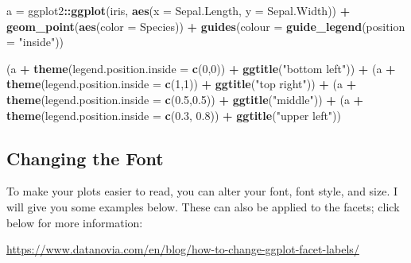 \documentclass[
]{book}
\newenvironment{Shaded}{\begin{snugshade}}{\end{snugshade}}
\newcommand{\AttributeTok}[1]{\textcolor[rgb]{0.13,0.29,0.53}{#1}}
\newcommand{\DecValTok}[1]{\textcolor[rgb]{0.00,0.00,0.81}{#1}}
\newcommand{\FloatTok}[1]{\textcolor[rgb]{0.00,0.00,0.81}{#1}}
\newcommand{\FunctionTok}[1]{\textcolor[rgb]{0.13,0.29,0.53}{\textbf{#1}}}
\newcommand{\NormalTok}[1]{#1}
\newcommand{\OtherTok}[1]{\textcolor[rgb]{0.56,0.35,0.01}{#1}}
\newcommand{\SpecialCharTok}[1]{\textcolor[rgb]{0.81,0.36,0.00}{\textbf{#1}}}
\newcommand{\StringTok}[1]{\textcolor[rgb]{0.31,0.60,0.02}{#1}}
\begin{document}
\begin{Shaded}
\begin{Highlighting}[]
\NormalTok{a }\OtherTok{=}\NormalTok{ ggplot2}\SpecialCharTok{::}\FunctionTok{ggplot}\NormalTok{(iris, }\FunctionTok{aes}\NormalTok{(}\AttributeTok{x =}\NormalTok{ Sepal.Length, }\AttributeTok{y =}\NormalTok{ Sepal.Width)) }\SpecialCharTok{+}
  \FunctionTok{geom\_point}\NormalTok{(}\FunctionTok{aes}\NormalTok{(}\AttributeTok{color =}\NormalTok{ Species)) }\SpecialCharTok{+}
  \FunctionTok{guides}\NormalTok{(}\AttributeTok{colour =} \FunctionTok{guide\_legend}\NormalTok{(}\AttributeTok{position =} \StringTok{"inside"}\NormalTok{))}

\NormalTok{(a }\SpecialCharTok{+} \FunctionTok{theme}\NormalTok{(}\AttributeTok{legend.position.inside =} \FunctionTok{c}\NormalTok{(}\DecValTok{0}\NormalTok{,}\DecValTok{0}\NormalTok{)) }\SpecialCharTok{+} \FunctionTok{ggtitle}\NormalTok{(}\StringTok{"bottom left"}\NormalTok{)) }\SpecialCharTok{+}
\NormalTok{  (a }\SpecialCharTok{+} \FunctionTok{theme}\NormalTok{(}\AttributeTok{legend.position.inside =} \FunctionTok{c}\NormalTok{(}\DecValTok{1}\NormalTok{,}\DecValTok{1}\NormalTok{)) }\SpecialCharTok{+} \FunctionTok{ggtitle}\NormalTok{(}\StringTok{"top right"}\NormalTok{)) }\SpecialCharTok{+}
\NormalTok{  (a }\SpecialCharTok{+} \FunctionTok{theme}\NormalTok{(}\AttributeTok{legend.position.inside =} \FunctionTok{c}\NormalTok{(}\FloatTok{0.5}\NormalTok{,}\FloatTok{0.5}\NormalTok{)) }\SpecialCharTok{+} \FunctionTok{ggtitle}\NormalTok{(}\StringTok{"middle"}\NormalTok{)) }\SpecialCharTok{+}
\NormalTok{  (a }\SpecialCharTok{+} \FunctionTok{theme}\NormalTok{(}\AttributeTok{legend.position.inside =} \FunctionTok{c}\NormalTok{(}\FloatTok{0.3}\NormalTok{, }\FloatTok{0.8}\NormalTok{)) }\SpecialCharTok{+} \FunctionTok{ggtitle}\NormalTok{(}\StringTok{"upper left"}\NormalTok{)) }
\end{Highlighting}
\end{Shaded}

\subsection{Changing the Font}\label{changing-the-font}

To make your plots easier to read, you can alter your font, font style, and size. I will give you some examples below. These can also be applied to the facets; click below for more information:

\url{https://www.datanovia.com/en/blog/how-to-change-ggplot-facet-labels/}
\end{document}
